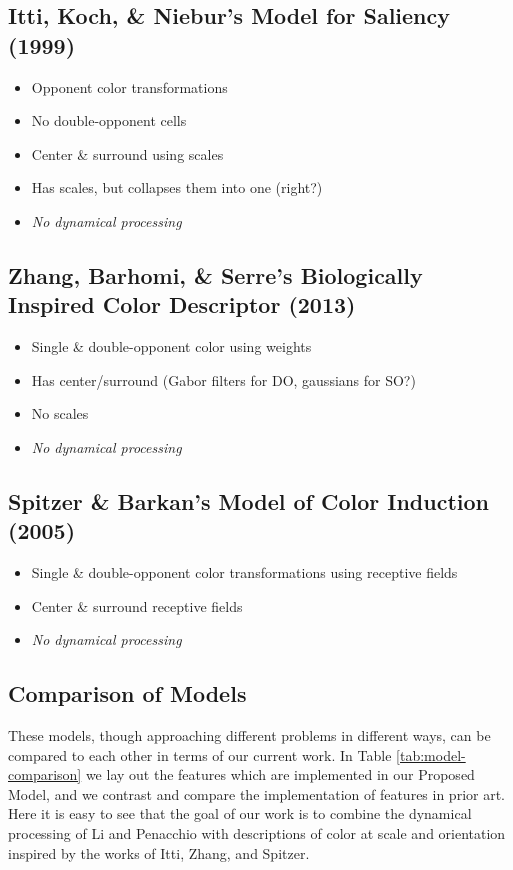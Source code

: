 \documentclass[journal,onecolumn]{IEEEtran}
\begin{document}
\subsection*{Itti, Koch, \& Niebur's Model for Saliency (1999)}
\begin{itemize}
    \item Opponent color transformations
    \item No double-opponent cells
    \item Center \& surround using scales
    \item Has scales, but collapses them into one (right?)
    \item \textit{No dynamical processing}
\end{itemize}


\subsection*{Zhang, Barhomi, \& Serre's Biologically Inspired Color Descriptor (2013)}
\begin{itemize}
    \item Single \& double-opponent color using weights
    \item Has center/surround (Gabor filters for DO, gaussians for SO?)
    \item No scales
    \item \textit{No dynamical processing}
\end{itemize}


\subsection*{Spitzer \& Barkan's Model of Color Induction (2005)}
\begin{itemize}
    \item Single \& double-opponent color transformations using receptive fields
    \item Center \& surround receptive fields
    \item \textit{No dynamical processing}
\end{itemize}

\subsection*{Comparison of Models}
These models, though approaching different problems in different ways, can be compared to each other in terms of our current work. In Table \ref{tab:model-comparison} we lay out the features which are implemented in our Proposed Model, and we contrast and compare the implementation of features in prior art. Here it is easy to see that the goal of our work is to combine the dynamical processing of Li and Penacchio with descriptions of color at scale and orientation inspired by the works of Itti, Zhang, and Spitzer.
\end{document}
